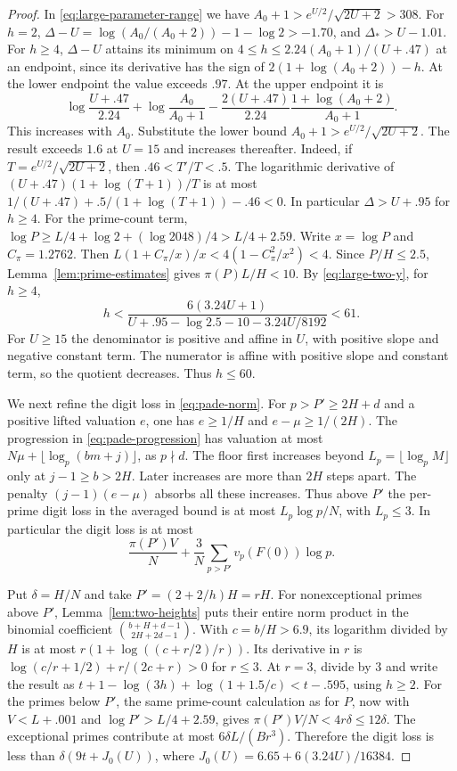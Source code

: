 \begin{proof}
In \eqref{eq:large-parameter-range} we have
\(A_0+1>e^{U/2}/\sqrt{2U+2}>308\).
For \(h=2\), \(\Delta-U=\log(A_0/(A_0+2))-1-\log2>-1.70\),
and \(\Delta_*>U-1.01\).
For \(h\ge4\), \(\Delta-U\) attains its minimum on
\(4\le h\le 2.24(A_0+1)/(U+.47)\) at an endpoint, since
its derivative has the sign of \(2(1+\log(A_0+2))-h\).
At the lower endpoint the value exceeds \(.97\).
At the upper endpoint it is
\[
 \log\frac{U+.47}{2.24}+\log\frac{A_0}{A_0+1}
 -\frac{2(U+.47)}{2.24}\frac{1+\log(A_0+2)}{A_0+1}.
\]
This increases with \(A_0\). Substitute the lower bound
\(A_0+1>e^{U/2}/\sqrt{2U+2}\). The result exceeds \(1.6\)
at \(U=15\) and increases thereafter. Indeed, if
\(T=e^{U/2}/\sqrt{2U+2}\), then \(.46<T'/T<.5\).
The logarithmic derivative of
\((U+.47)(1+\log(T+1))/T\) is at most
\(1/(U+.47)+.5/(1+\log(T+1))-.46<0\).
In particular \(\Delta>U+.95\) for \(h\ge4\).
For the prime-count term, \(\log P\ge
L/4+\log2+(\log2048)/4>L/4+2.59\).
Write \(x=\log P\) and \(C_\pi=1.2762\).
Then \(L(1+C_\pi/x)/x<4(1-C_\pi^2/x^2)<4\).
Since \(P/H\le2.5\), Lemma~\ref{lem:prime-estimates}
gives \(\pi(P)L/H<10\).
By \eqref{eq:large-two-y}, for \(h\ge4\),
\[
 h<\frac{6(3.24U+1)}
           {U+.95-\log2.5-10-3.24U/8192}<61 .
\]
For \(U\ge15\) the denominator is positive and affine in \(U\),
with positive slope and negative constant term.
The numerator is affine with positive slope and constant term,
so the quotient decreases. Thus \(h\le60\).

We next refine the digit loss in \eqref{eq:pade-norm}.
For \(p>P'\ge2H+d\) and a positive lifted valuation \(e\),
one has \(e\ge1/H\) and \(e-\mu\ge1/(2H)\).
The progression in \eqref{eq:pade-progression} has valuation
at most \(N\mu+\lfloor\log_p(bm+j)\rfloor\), as \(p\nmid d\).
The floor first increases beyond \(L_p=\lfloor\log_p M\rfloor\)
only at \(j-1\ge b>2H\). Later increases are more than \(2H\)
steps apart. The penalty \((j-1)(e-\mu)\) absorbs all these
increases. Thus above \(P'\) the per-prime digit loss in the
averaged bound is at most \(L_p\log p/N\), with \(L_p\le3\).
In particular the digit loss is at most
\begin{equation}\label{eq:large-digit}
 \frac{\pi(P')V}{N}+\frac3N\sum_{p>P'}v_p(F(0))\log p .
\end{equation}

Put \(\delta=H/N\) and take \(P'=(2+2/h)H=rH\).
For nonexceptional primes above \(P'\),
Lemma~\ref{lem:two-heights} puts their entire norm product
in the binomial coefficient
\(\binom{b+H+d-1}{2H+2d-1}\).
With \(c=b/H>6.9\), its logarithm divided by \(H\) is at most
\(r(1+\log((c+r/2)/r))\). Its derivative in \(r\) is
\(\log(c/r+1/2)+r/(2c+r)>0\) for \(r\le3\).
At \(r=3\), divide by \(3\) and write the result as
\(t+1-\log(3h)+\log(1+1.5/c)<t-.595\), using \(h\ge2\). For the primes below \(P'\), the same prime-count
calculation as for \(P\), now with \(V<L+.001\) and
\(\log P'>L/4+2.59\), gives \(\pi(P')V/N<4r\delta\le12\delta\).
The exceptional primes contribute at most \(6\delta L/(Br^3)\).
Therefore the digit loss is less than
\(\delta(9t+J_0(U))\), where \(J_0(U)=6.65+6(3.24U)/16384\).


\end{proof}
